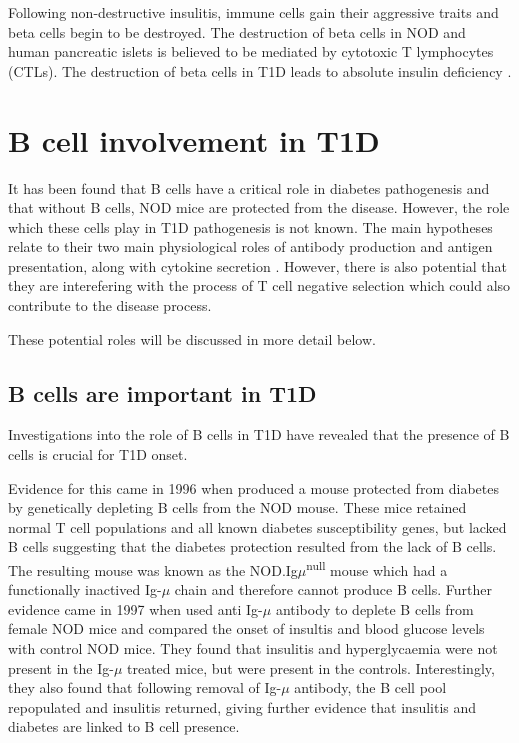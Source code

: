 Following non-destructive insulitis, immune cells gain their aggressive traits and beta cells begin to be destroyed.
The destruction of beta cells in NOD and human pancreatic islets is believed to be mediated by cytotoxic T lymphocytes (CTLs)\citep{Thomas2000, Brodie2008, Hanafusa2008}.
The destruction of beta cells in T1D leads to absolute insulin deficiency \citep{Daneman2006}.


\section{B cell involvement in T1D}
\label{sec:BcellsinT1D}

It has been found that B cells have a critical role in diabetes pathogenesis and that without B cells, NOD mice are protected from the disease.
However, the role which these cells play in T1D pathogenesis is not known.
The main hypotheses relate to their two main physiological roles of antibody production and antigen presentation, along with cytokine secretion \citep{Hinman2014}.
However, there is also potential that they are interefering with the process of T cell negative selection which could also contribute to the disease process.

These potential roles will be discussed in more detail below.

\subsection{B cells are important in T1D}

Investigations into the role of B cells in T1D have revealed that the presence of B cells is crucial for T1D onset.

Evidence for this came in 1996 when \citet{Serreze1996} produced a mouse protected from diabetes by genetically depleting B cells from the NOD mouse.
These mice retained normal T cell populations and all known diabetes susceptibility genes, but lacked B cells suggesting that the diabetes protection resulted from the lack of B cells.
The resulting mouse was known as the NOD.Ig$\mu$\textsuperscript{null} mouse which had a functionally inactived Ig-$\mu$ chain and therefore cannot produce B cells.
Further evidence came in 1997 when \citet{Noorchashm1997} used anti Ig-$\mu$ antibody to deplete B cells from female NOD mice and compared the onset of insultis and blood glucose levels with control NOD mice.
They found that insulitis and hyperglycaemia were not present in the Ig-$\mu$ treated mice, but were present in the controls.
Interestingly, they also found that following removal of Ig-$\mu$ antibody, the B cell pool repopulated and insulitis returned, giving further evidence that insulitis and diabetes are linked to B cell presence.


